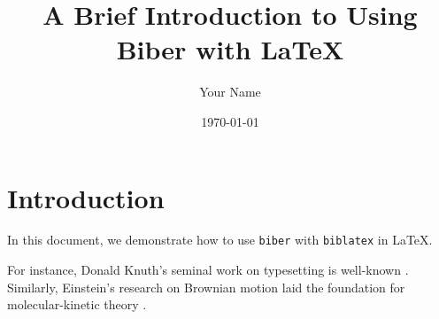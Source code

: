 \documentclass{article}
\begin{document}
\title{A Brief Introduction to Using Biber with LaTeX}
\author{Your Name}
\date{\today}
\maketitle

\section{Introduction}
In this document, we demonstrate how to use \texttt{biber} with \texttt{biblatex} in LaTeX. 

For instance, Donald Knuth's seminal work on typesetting is well-known \cite{knuth1984texbook}. Similarly, Einstein's research on Brownian motion laid the foundation for molecular-kinetic theory \cite{einstein1905motion}.

\printbibliography %
\end{document}
